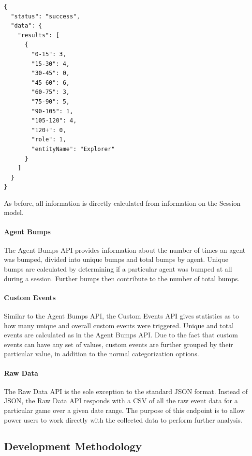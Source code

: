 \medskip
\begin{lstlisting}[caption=Gameplay Duration API response{,} showing the number of sessions that fell within certain ranges of gameplay time{,} categorized by the Explorer role, label={lst:duration_response}]
{
  "status": "success",
  "data": {
    "results": [
      {
        "0-15": 3,
        "15-30": 4,
        "30-45": 0,
        "45-60": 6,
        "60-75": 3,
        "75-90": 5,
        "90-105": 1,
        "105-120": 4,
        "120+": 0,
        "role": 1,
        "entityName": "Explorer"
      }
    ]
  }
}
\end{lstlisting}

As before, all information is directly calculated from information on the Session model.

\paragraph{Agent Bumps}

The Agent Bumps API provides information about the number of times an agent was bumped, divided into unique bumps and total bumps by agent. Unique bumps are calculated by determining if a particular agent was bumped at all during a session. Further bumps then contribute to the number of total bumps. 

\paragraph{Custom Events}

Similar to the Agent Bumps API, the Custom Events API gives statistics as to how many unique and overall custom events were triggered. Unique and total events are calculated as in the Agent Bumps API. Due to the fact that custom events can have any set of values, custom events are further grouped by their particular value, in addition to the normal categorization options.

\paragraph{Raw Data}

The Raw Data API is the sole exception to the standard JSON format. Instead of JSON, the Raw Data API responds with a CSV of all the raw event data for a particular game over a given date range. The purpose of this endpoint is to allow power users to work directly with the collected data to perform further analysis.


\subsection{Development Methodology}

